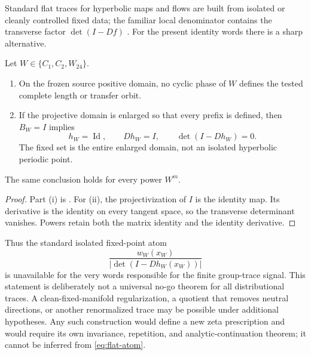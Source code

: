 Standard flat traces for hyperbolic maps and flows are built from isolated or
cleanly controlled fixed data; the familiar local denominator contains the
transverse factor $\det(I-Df)$
\citep{Fried1995,GiuliettiLiveraniPollicott2013,DyatlovZworski2016}.  For the
present identity words there is a sharp alternative.

\begin{theorem}
\label{thm:flat-dichotomy}
Let $W\in\{C_1,C_2,W_{24}\}$.
\begin{enumerate}[label=(\roman*)]
\item On the frozen source positive domain, no cyclic phase of $W$ defines
  the tested complete length or transfer orbit.
\item If the projective domain is enlarged so that every prefix is defined,
  then $B_W=I$ implies
  \begin{equation}
   h_W=\operatorname{Id},\qquad
   Dh_W=I,\qquad
   \det(I-Dh_W)=0.
   \label{eq:neutral-family}
  \end{equation}
  The fixed set is the entire enlarged domain, not an isolated hyperbolic
  periodic point.
\end{enumerate}
The same conclusion holds for every power $W^m$.
\end{theorem}

\begin{proof}
Part (i) is
.  For (ii), the
projectivization of $I$ is the identity map.  Its derivative is the identity
on every tangent space, so the transverse determinant vanishes.  Powers
retain both the matrix identity and the identity derivative.
\end{proof}

Thus the standard isolated fixed-point atom
\begin{equation}
 \frac{w_W(x_W)}{\left|\det(I-Dh_W(x_W))\right|}
 \label{eq:flat-atom}
\end{equation}
is unavailable for the very words responsible for the finite group-trace
signal.  This statement is deliberately not a universal no-go theorem for
all distributional traces.  A clean-fixed-manifold regularization, a quotient
that removes neutral directions, or another renormalized trace may be
possible under additional hypotheses.  Any such construction would define a
new zeta prescription and would require its own invariance, repetition, and
analytic-continuation theorem; it cannot be inferred from
\eqref{eq:flat-atom}.
